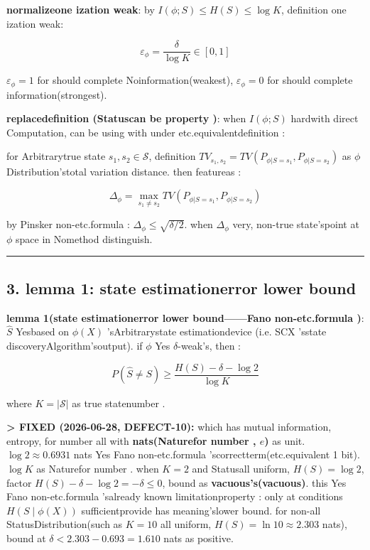 \documentclass[
  12pt,
]{article}
\begin{document}
\textbf{normalizeone ization weak}: by 
\(I(\phi; S) \leq H(S) \leq \log K\), definition one ization weak: 

\[\varepsilon_\phi = \frac{\delta}{\log K} \in [0, 1]\]

\(\varepsilon_\phi = 1\)
for should complete Noinformation(weakest), \(\varepsilon_\phi = 0\) for should complete information(strongest). 

\textbf{replacedefinition (Statuscan be property )}: when  \(I(\phi; S)\)
hardwith direct Computation, can be using with under etc.equivalentdefinition : 

for Arbitrarytrue state \(s_1, s_2 \in \mathcal{S}\), definition 
\(TV_{s_1,s_2} = TV(P_{\phi|S=s_1}, P_{\phi|S=s_2})\) as  \(\phi\)
Distribution'stotal variation distance. then featureas : 

\[\Delta_\phi = \max_{s_1 \neq s_2} TV(P_{\phi|S=s_1}, P_{\phi|S=s_2})\]

by  Pinsker non-etc.formula : \(\Delta_\phi \leq \sqrt{\delta / 2}\). when 
\(\Delta_\phi\) very, non-true state'spoint at  \(\phi\) space in Nomethod distinguish. 

\begin{center}\rule{0.5\linewidth}{0.5pt}\end{center}

\subsection{3. lemma 
1: state estimationerror lower bound}\label{ux5f15ux7406-1ux72b6ux6001ux4f30ux8ba1ux8befux5deeux4e0bux754c}

\textbf{lemma  1(state estimationerror lower bound------Fano non-etc.formula )}:  \(\hat{S}\)
Yesbased on  \(\phi(X)\) 'sArbitrarystate estimationdevice (i.e. SCX
'sstate discoveryAlgorithm'soutput). if  \(\phi\) Yes \(\delta\)-weak's, then : 

\[P(\hat{S} \neq S) \geq \frac{H(S) - \delta - \log 2}{\log K}\]

where \(K = |\mathcal{S}|\) as true statenumber . 

\textbf{\textgreater{} FIXED (2026-06-28, DEFECT-10):}
which has mutual information, entropy, for number all with  \textbf{nats(Naturefor number ,  \(e\))}
as unit. \(\log 2 \approx 0.6931\) nats Yes Fano non-etc.formula 'scorrectterm(etc.equivalent 1
bit). \(\log K\) as Naturefor number . when  \(K=2\)
and Statusall uniform, \(H(S) = \log 2\), factor 
\(H(S) - \delta - \log 2 = -\delta \leq 0\), bound as \textbf{vacuous's(vacuous)}. this Yes
Fano non-etc.formula 'salready known limitationproperty : only at conditions \(H(S \mid \phi(X))\)
sufficientprovide has meaning'slower bound. for non-all StatusDistribution(such as  \(K=10\)
all uniform, \(H(S) = \ln 10 \approx 2.303\) nats), bound at 
\(\delta < 2.303 - 0.693 = 1.610\) nats as positive. 
\end{document}
